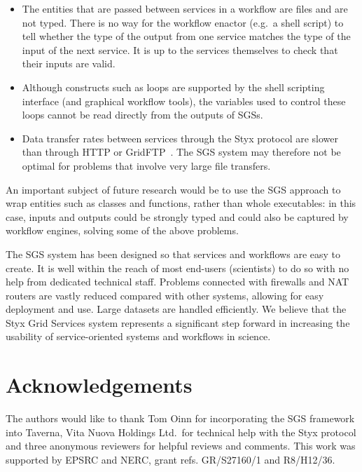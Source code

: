 \documentclass[a4paper]{article}
\begin{document}
\begin{itemize}
	\item The entities that are passed between services in a workflow are files and are not typed.  There is no way for the workflow enactor (e.g.\ a shell script) to tell whether the type of the output from one service matches the type of the input of the next service.  It is up to the services themselves to check that their inputs are valid.
	\item Although constructs such as loops are supported by the shell scripting interface (and graphical workflow tools), the variables used to control these loops cannot be read directly from the outputs of SGSs.
	\item Data transfer rates between services through the Styx protocol are slower than through HTTP or GridFTP~\cite{blower:2005}.  The SGS system may therefore not be optimal for problems that involve very large file transfers.
\end{itemize}

An important subject of future research would be to use the SGS approach to wrap entities such as classes and functions, rather than whole executables: in this case, inputs and outputs could be strongly typed and could also be captured by workflow engines, solving some of the above problems.

The SGS system has been designed so that services and workflows are easy to create.  It is well within the reach of most end-users (scientists) to do so with no help from dedicated technical staff.  Problems connected with firewalls and NAT routers are vastly reduced compared with other systems, allowing for easy deployment and use.  Large datasets are handled efficiently.  We believe that the Styx Grid Services system represents a significant step forward in increasing the usability of service-oriented systems and workflows in science.
%

\section*{Acknowledgements}
The authors would like to thank Tom Oinn for incorporating the SGS framework into Taverna, Vita Nuova Holdings Ltd.\ for technical help with the Styx protocol and three anonymous reviewers for helpful reviews and comments.  This work was supported by EPSRC and NERC, grant refs. GR/S27160/1 and R8/H12/36.




\newpage
\singlespace
\end{document}
